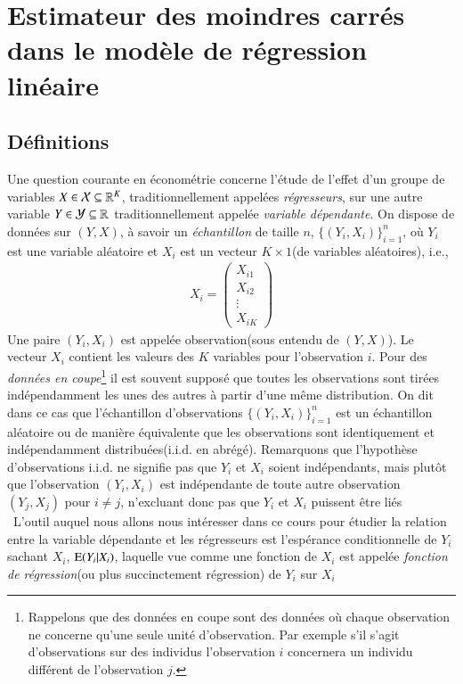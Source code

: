 \documentclass[10pt, reqno]{amsart}
\begin{document}
\section{Estimateur des moindres carrés dans le modèle de régression linéaire}
\subsection{Définitions}
Une question courante en économétrie concerne l'étude de l'effet d'un groupe de variables $X \in \mathcal{X}\subseteq \mathbb{R}^K$, traditionnellement appelées \emph{régresseurs}, sur une autre variable $Y\in \mathcal{Y}\subseteq\mathbb{R}$ traditionnellement  appelée \emph{variable dépendante}.  
On dispose de données  sur $(Y, X)$, à savoir un \emph{échantillon} de taille $n$,  $\{(Y_i, X_i)\}_{i=1}^n$, où $Y_i$ est une variable aléatoire et $X_i$ est un vecteur $K\times 1$(de variables aléatoires), i.e.,
\begin{align*}
X_i = 
\begin{pmatrix}
X_{i1}\\
X_{i2}\\
\vdots\\
X_{iK}	
\end{pmatrix}
\end{align*}
Une paire $(Y_i, X_i)$ est appelée observation(sous entendu de $(Y, X)$). Le vecteur $X_i$ contient les valeurs des $K$ variables pour l'observation $i$.
Pour des \emph{données en coupe}\footnote{Rappelons que des données en coupe sont des données où chaque observation ne concerne qu'une seule unité d'observation. Par exemple s'il s'agit d'observations sur des individus l'observation $i$ concernera un individu différent de l'observation $j$.} il est souvent supposé que toutes les observations sont tirées indépendamment les unes des autres à partir d'une même distribution. On dit dans ce cas que l'échantillon d'observations $\{(Y_i, X_i)\}_{i=1}^n$ est un échantillon aléatoire ou de manière équivalente que les observations sont identiquement et indépendamment distribuées(i.i.d. en abrégé). Remarquons que l'hypothèse d'observations i.i.d. ne signifie pas que $Y_i$ et $X_i$ soient indépendants, mais plutôt que l'observation $(Y_i, X_i)$ est indépendante de toute autre observation $(Y_j, X_j)$ pour $i\neq j$, n'excluant donc pas que $Y_i$ et $X_i$ puissent être liés\\\
L'outil auquel nous allons nous intéresser dans ce cours pour étudier la relation entre la variable dépendante et les régresseurs est l'espérance conditionnelle de $Y_i$ sachant $X_i$, $\operatorname{E}(Y_i| X_i)$, laquelle vue comme une fonction de $X_i$ est appelée \emph{fonction de régression}(ou plus succinctement régression) de $Y_i$ sur $X_i$\
\end{document}
